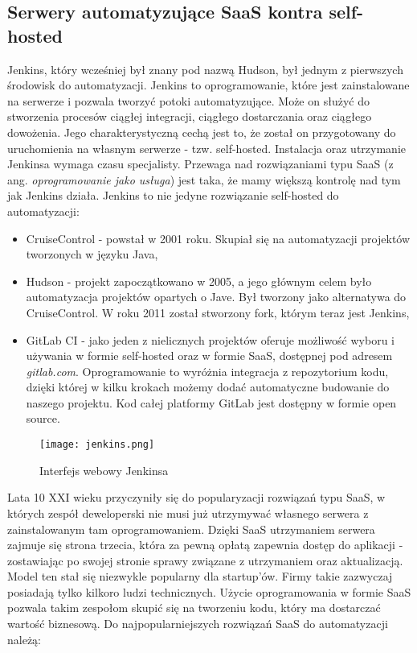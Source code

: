 \subsection{Serwery automatyzujące SaaS kontra self-hosted}
Jenkins, który wcześniej był znany pod nazwą Hudson, był jednym z pierwszych środowisk do automatyzacji. Jenkins to oprogramowanie, które jest zainstalowane na serwerze i pozwala tworzyć potoki automatyzujące. Może on służyć do stworzenia procesów ciągłej integracji, ciągłego dostarczania oraz ciągłego dowożenia. Jego charakterystyczną cechą jest to, że został on przygotowany do uruchomienia na własnym serwerze - tzw. self-hosted. Instalacja oraz utrzymanie Jenkinsa wymaga czasu specjalisty. Przewaga nad rozwiązaniami typu SaaS (z ang. \textit{oprogramowanie jako usługa}) jest taka, że mamy większą kontrolę nad tym jak Jenkins działa.
Jenkins to nie jedyne rozwiązanie self-hosted do automatyzacji:
\begin{itemize}
    \item CruiseControl - powstał w 2001 roku. Skupiał się na automatyzacji projektów tworzonych w języku Java,
    \item Hudson - projekt zapoczątkowano w 2005, a jego głównym celem było automatyzacja projektów opartych o Jave. Był tworzony jako alternatywa do CruiseControl. W roku 2011 został stworzony fork, którym teraz jest Jenkins,
    \item GitLab CI - jako jeden z nielicznych projektów oferuje możliwość wyboru i używania w formie self-hosted oraz w formie SaaS, dostępnej pod adresem \textit{gitlab.com}. Oprogramowanie to wyróżnia integracja z repozytorium kodu, dzięki której w kilku krokach możemy dodać automatyczne budowanie do naszego projektu. Kod całej platformy GitLab jest dostępny w formie open source.
\end{itemize}
\begin{figure}[htbp]
    \centering
    \texttt{[image: jenkins.png]}
    \caption{Interfejs webowy Jenkinsa}
    \label{fig:jenkins}
\end{figure}
\par
Lata 10 XXI wieku przyczyniły się do popularyzacji rozwiązań typu SaaS, w których zespół deweloperski nie musi już utrzymywać własnego serwera z zainstalowanym tam oprogramowaniem. Dzięki SaaS utrzymaniem serwera zajmuje się strona trzecia, która za pewną opłatą zapewnia dostęp do aplikacji - zostawiając po swojej stronie sprawy związane z utrzymaniem oraz aktualizacją. Model ten stał się niezwykle popularny dla startup'ów. Firmy takie zazwyczaj posiadają tylko kilkoro ludzi technicznych. Użycie oprogramowania w formie SaaS pozwala takim zespołom skupić się na tworzeniu kodu, który ma dostarczać wartość biznesową. Do najpopularniejszych rozwiązań SaaS do automatyzacji należą:
